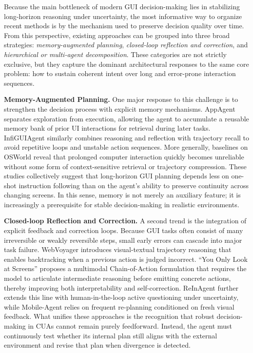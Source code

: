 Because the main bottleneck of modern GUI decision-making lies in stabilizing long-horizon reasoning under uncertainty, the most informative way to organize recent methods is by the mechanism used to preserve decision quality over time. From this perspective, existing approaches can be grouped into three broad strategies: \emph{memory-augmented planning}, \emph{closed-loop reflection and correction}, and \emph{hierarchical or multi-agent decomposition}. These categories are not strictly exclusive, but they capture the dominant architectural responses to the same core problem: how to sustain coherent intent over long and error-prone interaction sequences.

\textbf{Memory-Augmented Planning.}  
One major response to this challenge is to strengthen the decision process with explicit memory mechanisms. AppAgent \cite{zhang2025appagent} separates exploration from execution, allowing the agent to accumulate a reusable memory bank of prior UI interactions for retrieval during later tasks. InfiGUIAgent \cite{liu2025infiguiagent} similarly combines reasoning and reflection with trajectory recall to avoid repetitive loops and unstable action sequences. More generally, baselines on OSWorld \cite{xie2024osworld} reveal that prolonged computer interaction quickly becomes unreliable without some form of context-sensitive retrieval or trajectory compression. These studies collectively suggest that long-horizon GUI planning depends less on one-shot instruction following than on the agent's ability to preserve continuity across changing screens. In this sense, memory is not merely an auxiliary feature; it is increasingly a prerequisite for stable decision-making in realistic environments.

\textbf{Closed-loop Reflection and Correction.}  
A second trend is the integration of explicit feedback and correction loops. Because GUI tasks often consist of many irreversible or weakly reversible steps, small early errors can cascade into major task failure. WebVoyager \cite{he2024webvoyager} introduces visual-textual trajectory reasoning that enables backtracking when a previous action is judged incorrect. ``You Only Look at Screens'' \cite{zhang2024you} proposes a multimodal Chain-of-Action formulation that requires the model to articulate intermediate reasoning before emitting concrete actions, thereby improving both interpretability and self-correction. ReInAgent \cite{jia2025reinagent} further extends this line with human-in-the-loop active questioning under uncertainty, while Mobile-Agent \cite{wang2024mobile} relies on frequent re-planning conditioned on fresh visual feedback. What unifies these approaches is the recognition that robust decision-making in CUAs cannot remain purely feedforward. Instead, the agent must continuously test whether its internal plan still aligns with the external environment and revise that plan when divergence is detected.

